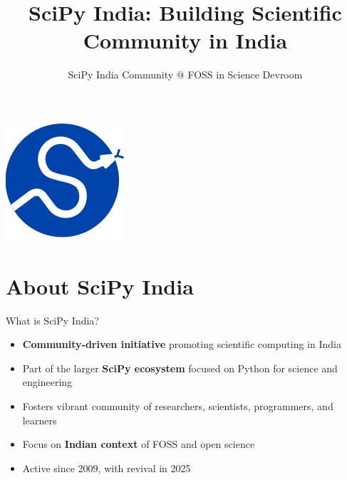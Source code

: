 \documentclass[16pt,t]{beamer}
\title[]{
\textbf{SciPy India: Building Scientific Community in India}}
\author{SciPy India Community @ FOSS in Science Devroom}
\date{}
\begin{document}
\begin{frame}[Title]
\begin{center}
\includegraphics[scale=0.65]{Figures/SciPy_India_logo.png}
\end{center}
\maketitle
\end{frame}


\section{About SciPy India}

\begin{frame}{What is SciPy India?}
\begin{itemize}
    \item \textbf{Community-driven initiative} promoting scientific computing in India
    \item Part of the larger \textbf{SciPy ecosystem} focused on Python for science and engineering
    \item Fosters vibrant community of researchers, scientists, programmers, and learners
    \item Focus on \textbf{Indian context} of FOSS and open science
    \item Active since 2009, with revival in 2025
\end{itemize}
\end{frame}

\end{document}
